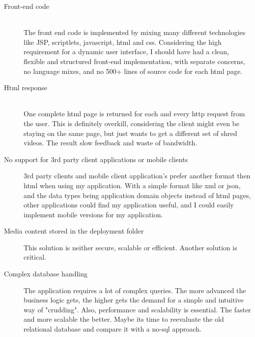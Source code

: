 		\begin{description}
			\item[Front-end code] \hfill \\
			The front end code is implemented by mixing many different technologies like JSP, scriptlets, javascript, html and css. Considering the high requirement for a dynamic user interface, I should have had a clean, flexible and structured front-end implementation, with separate concerns, no language mixes, and no 500+ lines of source code for each html page.
			\item[Html response] \hfill \\
			One complete html page is returned for each and every http request from the user. This is definitely overkill, considering the client might even be staying on the same page, but just wants to get a different set of shred videos. The result slow feedback and waste of bandwidth. 
			
			\item[No support for 3rd party client applications or mobile clients]
			3rd party clients and mobile client application's prefer another format then html when using my application. With a simple format like xml or json, and the data types being application domain objects instead of html pages, other applications could find my application useful, and I could easily implement mobile versions for my application. 
	
			\item[Media content stored in the deployment folder]
			This solution is neither secure, scalable or efficient. Another solution is critical.
			
			\item[Complex database handling]
			The application requires a lot of complex queries. The more advanced the business logic gets, the higher gets the demand for a simple and intuitive way of "crudding". Also, performance and scalability is essential. The faster and more scalable the better. Maybe its time to reevaluate the old relational database and compare it with a no-sql approach. 
				
		\end{description}
		
